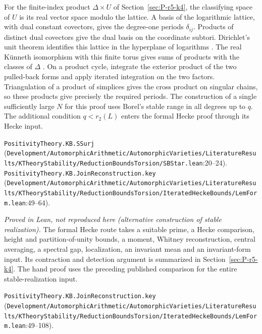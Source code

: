 For the finite-index product $\Delta\times U$ of Section~\ref{sec:P-r5-k4}, the classifying space of $U$ is its real vector space modulo the lattice. A basis of the logarithmic lattice, with dual constant covectors, gives the degree-one periods $\delta_{ij}$. Products of distinct dual covectors give the dual basis on the coordinate subtori. Dirichlet's unit theorem identifies this lattice in the hyperplane of logarithms \cite[Theorem 5.1]{P-Milne-Mink}. The real K\"unneth isomorphism with this finite torus gives sums of products with the classes of $\Delta$ \cite[\S3.2]{P-R6-Hatcher}. On a product cycle, integrate the exterior product of the two pulled-back forms and apply iterated integration on the two factors. Triangulation of a product of simplices gives the cross product on singular chains, so these products give precisely the required periods. The construction of a single sufficiently large $N$ for this proof uses Borel's stable range in all degrees up to $q$. The additional condition $q<r_2(L)$ enters the formal Hecke proof through its Hecke input.
\par{\footnotesize \nolinkurl{PositivityTheory.KB.SSurj} (\nolinkurl{Development/AutomorphicArithmetic/AutomorphicVarieties/LiteratureResults/KTheoryStability/ReductionBoundsTorsion/SBStar.lean}\allowbreak:20--24). \nolinkurl{PositivityTheory.KB.JoinReconstruction.key} (\nolinkurl{Development/AutomorphicArithmetic/AutomorphicVarieties/LiteratureResults/KTheoryStability/ReductionBoundsTorsion/IteratedHeckeBounds/LemForm.lean}\allowbreak:49--64).\par}

\emph{Proved in Lean, not reproduced here (alternative construction of stable realization).} The formal Hecke route takes a suitable prime, a Hecke comparison, height and partition-of-unity bounds, a moment, Whitney reconstruction, central averaging, a spectral gap, localization, an invariant mean and an invariant-form input. Its contraction and detection argument is summarized in Section~\ref{sec:P-r5-k4}. The hand proof uses the preceding published comparison for the entire stable-realization input.
\par{\footnotesize \nolinkurl{PositivityTheory.KB.JoinReconstruction.key} (\nolinkurl{Development/AutomorphicArithmetic/AutomorphicVarieties/LiteratureResults/KTheoryStability/ReductionBoundsTorsion/IteratedHeckeBounds/LemForm.lean}\allowbreak:49--108).\par}

